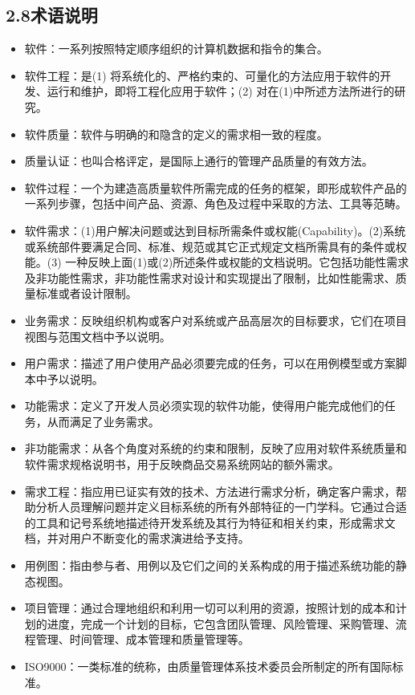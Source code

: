 \documentclass[24pt,a4paper]{article}%
\begin{document}
\subsection*{\songti 2.8术语说明}
\begin{itemize}
	\item 软件：一系列按照特定顺序组织的计算机数据和指令的集合。
	\item 软件工程：是(1) 将系统化的、严格约束的、可量化的方法应用于软件的开发、运行和维护，即将工程化应用于软件；(2) 对在(1)中所述方法所进行的研究。
	\item 软件质量：软件与明确的和隐含的定义的需求相一致的程度。
	\item 质量认证：也叫合格评定，是国际上通行的管理产品质量的有效方法。
	\item 软件过程：一个为建造高质量软件所需完成的任务的框架，即形成软件产品的一系列步骤，包括中间产品、资源、角色及过程中采取的方法、工具等范畴。
	\item 软件需求：(1)用户解决问题或达到目标所需条件或权能(Capability)。(2)系统或系统部件要满足合同、标准、规范或其它正式规定文档所需具有的条件或权能。(3) 一种反映上面(1)或(2)所述条件或权能的文档说明。它包括功能性需求及非功能性需求，非功能性需求对设计和实现提出了限制，比如性能需求、质量标准或者设计限制。
	\item 业务需求：反映组织机构或客户对系统或产品高层次的目标要求，它们在项目视图与范围文档中予以说明。
	\item 用户需求：描述了用户使用产品必须要完成的任务，可以在用例模型或方案脚本中予以说明。
	\item 功能需求：定义了开发人员必须实现的软件功能，使得用户能完成他们的任务，从而满足了业务需求。
	\item 非功能需求：从各个角度对系统的约束和限制，反映了应用对软件系统质量和软件需求规格说明书，用于反映商品交易系统网站的额外需求。
	\item 需求工程：指应用已证实有效的技术、方法进行需求分析，确定客户需求，帮助分析人员理解问题并定义目标系统的所有外部特征的一门学科。它通过合适的工具和记号系统地描述待开发系统及其行为特征和相关约束，形成需求文档，并对用户不断变化的需求演进给予支持。
	\item 用例图：指由参与者、用例以及它们之间的关系构成的用于描述系统功能的静态视图。
	\item 项目管理：通过合理地组织和利用一切可以利用的资源，按照计划的成本和计划的进度，完成一个计划的目标，它包含团队管理、风险管理、采购管理、流程管理、时间管理、成本管理和质量管理等。
	\item ISO9000：一类标准的统称，由质量管理体系技术委员会所制定的所有国际标准。
\end{itemize}
\end{document}
